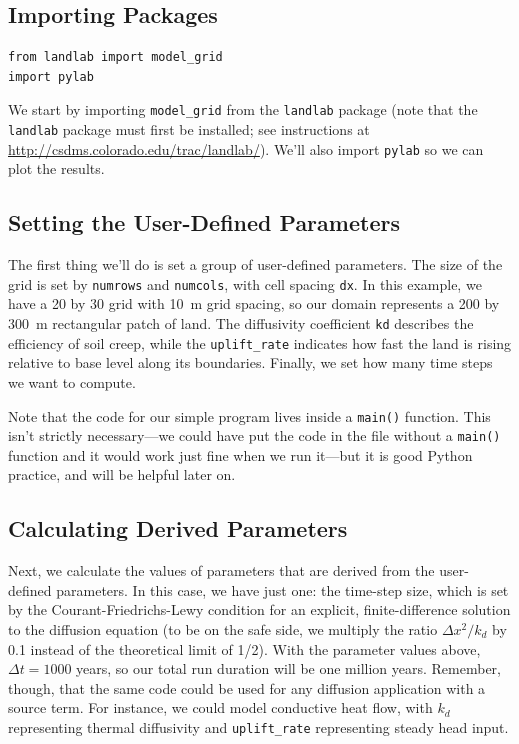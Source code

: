 \documentclass[12pt]{article}
\newcommand{\code}[1]{{\tt #1}}
\begin{document}
\newpage
\subsection{Importing Packages}

\begin{lstlisting}[firstnumber=11]
from landlab import model_grid
import pylab
\end{lstlisting}

We start by importing {\tt model\_grid} from the {\tt landlab} package (note that the {\tt landlab} package must first be installed; see instructions at \url{http://csdms.colorado.edu/trac/landlab/}). We'll also import {\tt pylab} so we can plot the results.


\subsection{Setting the User-Defined Parameters}



The first thing we'll do is set a group of user-defined parameters. The size of the grid is set by \code{numrows} and \code{numcols}, with cell spacing \code{dx}. In this example, we have a 20 by 30 grid with 10~m grid spacing, so our domain represents a 200 by 300~m rectangular patch of land. The diffusivity coefficient \code{kd} describes the efficiency of soil creep, while the \code{uplift\_rate} indicates how fast the land is rising relative to base level along its boundaries. Finally, we set how many time steps we want to compute.

Note that the code for our simple program lives inside a \code{main()} function. This isn't strictly necessary---we could have put the code in the file without a \code{main()} function and it would work just fine when we run it---but it is good Python practice, and will be helpful later on.

\break
\subsection{Calculating Derived Parameters}



Next, we calculate the values of parameters that are derived from the user-defined parameters. In this case, we have just one: the time-step size, which is set by the Courant-Friedrichs-Lewy condition for an explicit, finite-difference solution to the diffusion equation (to be on the safe side, we multiply the ratio $\Delta x^2 / k_d$ by 0.1 instead of the theoretical limit of 1/2). With the parameter values above, $\Delta t = 1000$ years, so our total run duration will be one million years. Remember, though, that the same code could be used for any diffusion application with a source term. For instance, we could model conductive heat flow, with $k_d$ representing thermal diffusivity and \code{uplift\_rate} representing steady head input.
\end{document}

